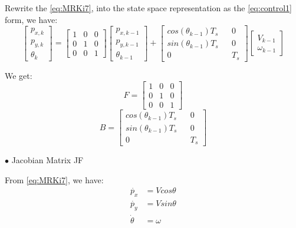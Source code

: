 Rewrite the \ref{eq:MRKi7}, into the state space representation as the \ref{eq:control1} form, we have:
\begin{equation}
\begin{bmatrix}
p_{x,k}\\
p_{y,k}\\
\theta_k
\end{bmatrix}=\begin{bmatrix}
1 & 0 & 0\\
0 & 1 & 0\\
0 & 0 & 1
\end{bmatrix}\begin{bmatrix}
p_{x,k-1}\\
p_{y,k-1}\\
\theta_{k-1}
\end{bmatrix}+\begin{bmatrix}
cos(\theta_{k-1}) T_s && 0\\
sin(\theta_{k-1}) T_s && 0\\
0 && T_s
\end{bmatrix}
\begin{bmatrix}
V_{k-1}\\
\omega_{k-1}
\end{bmatrix}
\end{equation}

We get:
\begin{equation}
F = \begin{bmatrix}
1 & 0 & 0\\
0 & 1 & 0\\
0 & 0 & 1
\end{bmatrix}
\end{equation}
\begin{equation}
B = \begin{bmatrix}
cos(\theta_{k-1}) T_s && 0\\
sin(\theta_{k-1}) T_s && 0\\
0 && T_s
\end{bmatrix}
\end{equation}


$\bullet$ Jacobian Matrix JF\par
From \ref{eq:MRKi7}, we have:
\begin{equation} \label{eq:control2}
\begin{split}
\Dot{p_x} &= V cos \theta\\
\Dot{p_y} &= V sin \theta\\
\Dot{\theta} &= \omega
\end{split}
\end{equation}

